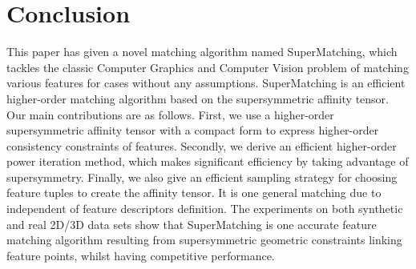 \section{Conclusion}
\label{sec:conclusion}

This paper has given a novel matching algorithm named SuperMatching,
which tackles the classic Computer Graphics and Computer Vision problem of matching various features for cases without any assumptions.
SuperMatching is an efficient higher-order matching algorithm based on the supersymmetric affinity tensor.
Our main contributions are as follows.
First, we use a  higher-order supersymmetric affinity tensor with a compact form to express higher-order consistency constraints of features.
Secondly, we derive an efficient higher-order power iteration method, which makes significant efficiency by taking advantage of supersymmetry.
Finally, we also give an efficient sampling strategy for choosing feature tuples to create the affinity tensor.
It is one general matching due to independent of feature descriptors definition.
The experiments on both synthetic and real 2D/3D data sets show that 
SuperMatching is one accurate feature matching algorithm resulting from supersymmetric geometric constraints linking feature points, whilst having competitive performance.


